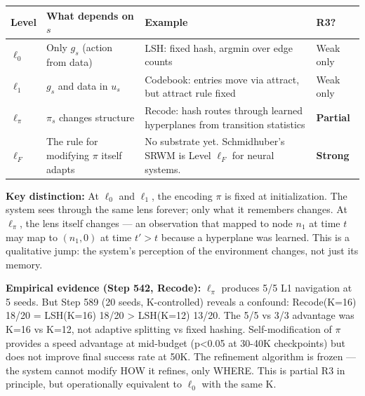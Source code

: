 \documentclass[
  11pt,
]{article}
\newcounter{none} %
\begin{document}
{\def\LTcaptype{none} %
\begin{longtable}[]{@{}
  >{\raggedright\arraybackslash}p{}
  >{\raggedright\arraybackslash}p{}
  >{\raggedright\arraybackslash}p{}
  >{\raggedright\arraybackslash}p{}@{}}
\toprule\noalign{}
\begin{minipage}[b]{\linewidth}\raggedright
Level
\end{minipage} & \begin{minipage}[b]{\linewidth}\raggedright
What depends on \(s\)
\end{minipage} & \begin{minipage}[b]{\linewidth}\raggedright
Example
\end{minipage} & \begin{minipage}[b]{\linewidth}\raggedright
R3?
\end{minipage} \\
\midrule\noalign{}
\endhead
\bottomrule\noalign{}
\endlastfoot
\(\ell_0\) & Only \(g_s\) (action from data) & LSH: fixed hash, argmin
over edge counts & Weak only \\
\(\ell_1\) & \(g_s\) and data in \(u_s\) & Codebook: entries move via
attract, but attract rule fixed & Weak only \\
\(\ell_\pi\) & \(\pi_s\) changes structure & Recode: hash routes through
learned hyperplanes from transition statistics & \textbf{Partial} \\
\(\ell_F\) & The rule for modifying \(\pi\) itself adapts & No substrate
yet. Schmidhuber's SRWM is Level \(\ell_F\) for neural systems. &
\textbf{Strong} \\
\end{longtable}
}

\textbf{Key distinction:} At \(\ell_0\) and \(\ell_1\), the encoding
\(\pi\) is fixed at initialization. The system sees through the same
lens forever; only what it remembers changes. At \(\ell_\pi\), the lens
itself changes --- an observation that mapped to node \(n_1\) at time
\(t\) may map to \((n_1, 0)\) at time \(t' > t\) because a hyperplane
was learned. This is a qualitative jump: the system's perception of the
environment changes, not just its memory.

\textbf{Empirical evidence (Step 542, Recode):} \(\ell_\pi\) produces
5/5 L1 navigation at 5 seeds. But Step 589 (20 seeds, K-controlled)
reveals a confound: Recode(K=16) 18/20 = LSH(K=16) 18/20 \textgreater{}
LSH(K=12) 13/20. The 5/5 vs 3/3 advantage was K=16 vs K=12, not adaptive
splitting vs fixed hashing. Self-modification of \(\pi\) provides a
speed advantage at mid-budget (p\textless0.05 at 30-40K checkpoints) but
does not improve final success rate at 50K. The refinement algorithm is
frozen --- the system cannot modify HOW it refines, only WHERE. This is
partial R3 in principle, but operationally equivalent to \(\ell_0\) with
the same K.
\end{document}
